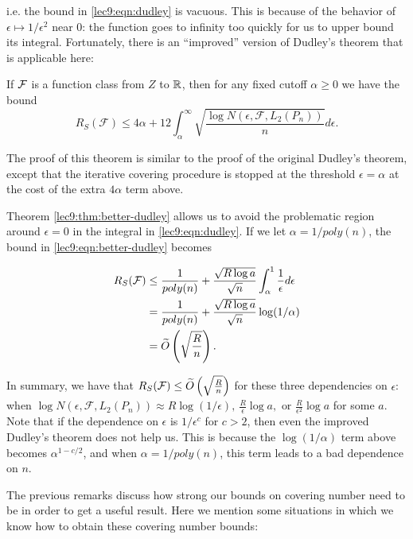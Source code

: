 \begin{enumerate}
i.e. the bound in \eqref{lec9:eqn:dudley} is vacuous. This is because of the behavior of $\epsilon \mapsto 1/\epsilon^2$ near 0: the function goes to infinity too quickly for us to upper bound its integral. Fortunately, there is an ``improved'' version of Dudley's theorem that is applicable here:
        
\begin{theorem}\label{lec9:thm:better-dudley}
If $\mathcal F$ is a function class from $Z$ to $\mathbb R$, then for any fixed cutoff $\alpha \geq 0$ we have the bound
\begin{equation}\label{lec9:eqn:better-dudley}
R_S(\mathcal{F})\leq 4\alpha + 12\int_{\alpha}^{\infty}\sqrt{\frac{\log N(\epsilon, \mathcal{F}, L_2({P_n}))}{n}}d\epsilon.      
\end{equation}
\end{theorem}
The proof of this theorem is similar to the proof of the original Dudley's theorem, except that the iterative covering procedure is stopped at the threshold $\epsilon = \alpha$ at the cost of the extra $4\alpha$ term above.
        
Theorem \ref{lec9:thm:better-dudley} allows us to avoid the problematic region around $\epsilon=0$ in the integral in \eqref{lec9:eqn:dudley}. If we let $\alpha = 1/poly(n)$, the bound in \eqref{lec9:eqn:better-dudley} becomes
        
\begin{align}
R_S(\mathcal{F}) &\leq \frac{1}{poly(n)} + \frac{\sqrt{R\log a}}{\sqrt{n}}\int_{\alpha}^1\frac{1}{\epsilon}d\epsilon \\
&= \frac{1}{poly(n)}  + \frac{\sqrt{R\log a}}{\sqrt{n}} \log(1/\alpha) \\
&= \widetilde{O} \left(\sqrt{\frac{R}{n}}\right).
\end{align}
\end{enumerate}

In summary, we have that $R_S(\mathcal{F}) \leq \widetilde{O}\left(\sqrt{\frac{R}{n}}\right)$ for these three dependencies on $\epsilon$: when $\log N(\epsilon, \mathcal{F}, L_2({P_n})) \approx R\log (1/\epsilon),\ \frac{R}{\epsilon} \log a,\text{ or } \frac{R}{\epsilon^2} \log a$ for some $a$. Note that if the dependence on $\epsilon$ is $1/\epsilon^c$ for $c > 2$, then even the improved Dudley's theorem does not help us. This is because the $\log(1/\alpha)$ term above becomes $\alpha^{1-c/2}$, and when $\alpha = 1/poly(n)$, this term leads to a bad dependence on $n$.

The previous remarks discuss how strong our bounds on covering number need to be in order to get a useful result. Here we mention some situations in which we know how to obtain these covering number bounds:

